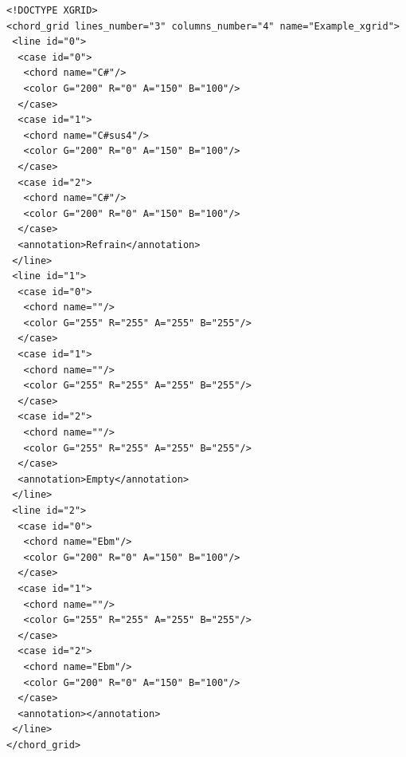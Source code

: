 \begin{verbatim}                                                                                          
<!DOCTYPE XGRID>
<chord_grid lines_number="3" columns_number="4" name="Example_xgrid">
 <line id="0">
  <case id="0">
   <chord name="C#"/>
   <color G="200" R="0" A="150" B="100"/>
  </case>
  <case id="1">
   <chord name="C#sus4"/>
   <color G="200" R="0" A="150" B="100"/>
  </case>
  <case id="2">
   <chord name="C#"/>
   <color G="200" R="0" A="150" B="100"/>
  </case>
  <annotation>Refrain</annotation>
 </line>
 <line id="1">
  <case id="0">
   <chord name=""/>
   <color G="255" R="255" A="255" B="255"/>
  </case>
  <case id="1">
   <chord name=""/>
   <color G="255" R="255" A="255" B="255"/>
  </case>
  <case id="2">
   <chord name=""/>
   <color G="255" R="255" A="255" B="255"/>
  </case>
  <annotation>Empty</annotation>
 </line>
 <line id="2">
  <case id="0">
   <chord name="Ebm"/>
   <color G="200" R="0" A="150" B="100"/>
  </case>
  <case id="1">
   <chord name=""/>
   <color G="255" R="255" A="255" B="255"/>
  </case>
  <case id="2">
   <chord name="Ebm"/>
   <color G="200" R="0" A="150" B="100"/>
  </case>
  <annotation></annotation>
 </line>
</chord_grid>                                                                            
\end{verbatim}


